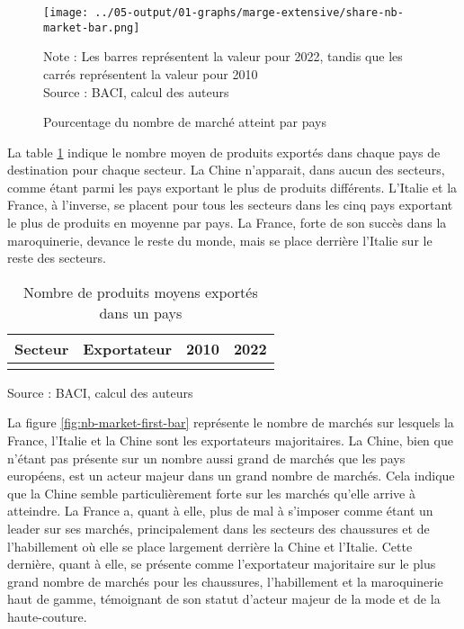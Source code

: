 \documentclass[french,10pt,a4paper]{article}
\begin{document}
\begin{figure}[!h]
  \centering
  \texttt{[image: ../05-output/01-graphs/marge-extensive/share-nb-market-bar.png]}
  \captionsetup{justification=justified, singlelinecheck=false, font=small}
  \caption*{Note : Les barres représentent la valeur pour 2022, tandis que les carrés représentent la valeur pour 2010 \\
  Source : BACI, calcul des auteurs}
  \captionsetup{justification=centering, singlelinecheck=true, font=normalsize}
  \caption{Pourcentage du nombre de marché atteint par pays}
  \label{fig:nb-market-bar}
\end{figure}

La table \ref{tab:table-nb-mean-product-export} indique le nombre moyen de produits exportés dans chaque pays de destination pour chaque secteur. La Chine n'apparait, dans aucun des secteurs, comme étant parmi les pays exportant le plus de produits différents. L'Italie et la France, à l'inverse, se placent pour tous les secteurs dans les cinq pays exportant le plus de produits en moyenne par pays. La France, forte de son succès dans la maroquinerie, devance le reste du monde, mais se place derrière l'Italie sur le reste des secteurs.

\begin{table}[ht]
  \centering
  \begin{tabular}{lrrr}
    \hline
   Secteur & Exportateur & 2010 & 2022 \\
    \hline
    \\
    \hline
  \end{tabular}
  \captionsetup{justification=raggedright,singlelinecheck=false, font=small}
  \caption*{Source : BACI, calcul des auteurs}
  \captionsetup{justification=centering, singlelinecheck=true, font=normalsize}
  \caption{Nombre de produits moyens exportés dans un pays}
  \label{tab:table-nb-mean-product-export}
\end{table}

La figure \ref{fig:nb-market-first-bar} représente le nombre de marchés sur lesquels la France, l'Italie et la Chine sont les exportateurs majoritaires. La Chine, bien que n'étant pas présente sur un nombre aussi grand de marchés que les pays européens, est un acteur majeur dans un grand nombre de marchés. Cela indique que la Chine semble particulièrement forte sur les marchés qu'elle arrive à atteindre. La France a, quant à elle, plus de mal à s'imposer comme étant un leader sur ses marchés, principalement dans les secteurs des chaussures et de l'habillement où elle se place largement derrière la Chine et l'Italie. Cette dernière, quant à elle, se présente comme l'exportateur majoritaire sur le plus grand nombre de marchés pour les chaussures, l'habillement et la maroquinerie haut de gamme, témoignant de son statut d'acteur majeur de la mode et de la haute-couture.
\end{document}
